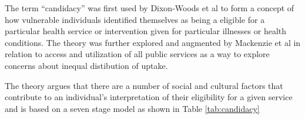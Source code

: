 \documentclass[12pt,]{report}
\begin{document}
The term ``candidacy'' was first used by Dixon-Woods et al
\citetext{\citeyear{RN438}; \citeyear{RN437}} to form a concept of how
vulnerable individuals identified themselves as being a eligible for a
particular health service or intervention given for particular illnesses
or health conditions. The theory was further explored and augmented by
Mackenzie et al \citetext{\citeyear{RN84}; \citeyear{RN434}} in relation
to access and utilization of all public services as a way to explore
concerns about inequal distibution of uptake.

The theory argues that there are a number of social and cultural factors
that contribute to an individual's interpretation of their eligibility
for a given service and is based on a seven stage model as shown in
Table \ref{tab:candidacy}

\begin{table}[h]
\centering
\caption{Seven stage model of candidacy}
\label{tab:candidacy}
\end{table}
\end{document}

